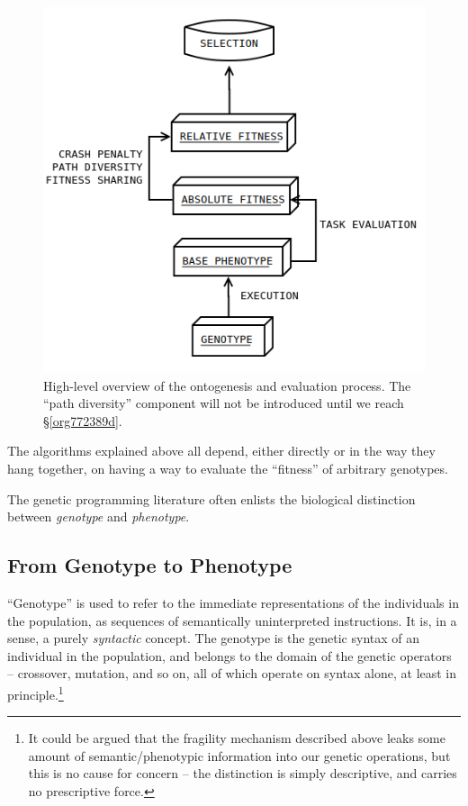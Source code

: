 \documentclass[12pt,glossary]{dalthesis}
\begin{document}
\begin{figure}[htbp]
\centering
\includegraphics[width=.9\linewidth]{../images/evaluation_model.png}
\caption{\label{fig:orgeb556d7}
High-level overview of the ontogenesis and evaluation process. The ``path diversity'' component will not be introduced until we reach \S \ref{org772389d}.}
\end{figure}

The algorithms explained above all depend, either directly or in the way they
hang together, on having a way to evaluate the ``fitness'' of arbitrary genotypes.

The genetic programming literature often enlists the biological distinction
between \emph{genotype} and \emph{phenotype}.

\subsection{From Genotype to Phenotype}
\label{sec:orga4d22b0}
\label{org4e135eb}

``Genotype'' is used to refer to the immediate representations of the individuals
in the population, as sequences of semantically uninterpreted instructions. It
is, in a sense, a purely \emph{syntactic} concept. The genotype is the genetic syntax
of an individual in the population, and belongs to the domain of the genetic
operators -- crossover, mutation, and so on, all of which operate on syntax alone,
at least in principle.\footnote{It could be argued that the fragility mechanism described above leaks some
  amount of semantic/phenotypic information into our genetic operations, but
  this is no cause for concern -- the distinction is simply descriptive, and
  carries no prescriptive force.}
\end{document}
